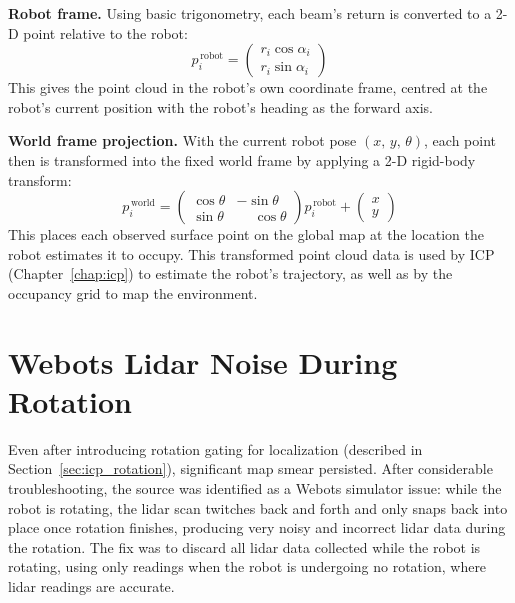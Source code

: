 \documentclass[12pt]{report}
\begin{document}
\textbf{Robot frame.}
Using basic trigonometry, each beam's return is converted to a 2-D point relative to the robot:
\begin{equation}
    p_i^{\,\text{robot}} =
    \begin{pmatrix} r_i \cos\alpha_i \\ r_i \sin\alpha_i \end{pmatrix}
\end{equation}
This gives the point cloud in the robot's own coordinate frame, centred at the robot's current
position with the robot's heading as the forward axis.

\textbf{World frame projection.}
With the current robot pose $(x,\, y,\, \theta)$, each point then is transformed into the fixed world
frame by applying a 2-D rigid-body transform:
\begin{equation}
    p_i^{\,\text{world}} =
    \begin{pmatrix} \cos\theta & -\sin\theta \\ \sin\theta & \phantom{-}\cos\theta \end{pmatrix}
    p_i^{\,\text{robot}}
    +
    \begin{pmatrix} x \\ y \end{pmatrix}
\end{equation}
This places each observed surface point on the global map at the location the robot estimates it
to occupy.
This transformed point cloud data is used by ICP (Chapter~\ref{chap:icp}) to estimate the robot's trajectory, 
as well as by the occupancy grid to map the environment. 




\newpage

\section{Webots Lidar Noise During Rotation}
\label{sec:webots_bug}

Even after introducing rotation gating for localization (described in
Section~\ref{sec:icp_rotation}), significant map smear persisted.
After considerable troubleshooting, the source was identified as a Webots simulator issue: while
the robot is rotating, the lidar scan twitches back and forth and only snaps back into place once
rotation finishes, producing very noisy and incorrect lidar data during the rotation.
The fix was to discard all lidar data collected while the robot is rotating, using only readings when the 
robot is undergoing no rotation, where lidar readings are accurate.
\end{document}
